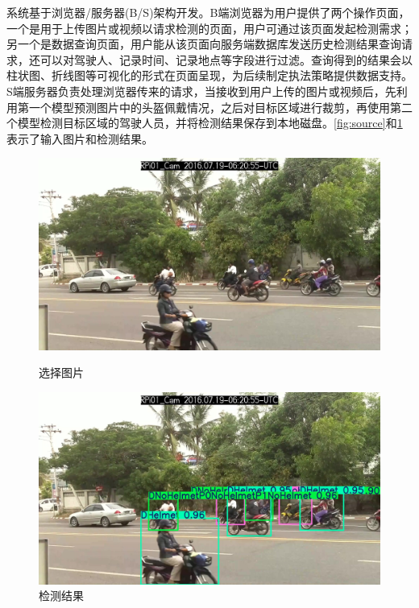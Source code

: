 系统基于浏览器/服务器(B/S)架构开发。B端浏览器为用户提供了两个操作页面，一个是用于上传图片或视频以请求检测的页面，用户可通过该页面发起检测需求；另一个是数据查询页面，用户能从该页面向服务端数据库发送历史检测结果查询请求，还可以对驾驶人、记录时间、记录地点等字段进行过滤。查询得到的结果会以柱状图、折线图等可视化的形式在页面呈现，为后续制定执法策略提供数据支持。S端服务器负责处理浏览器传来的请求，当接收到用户上传的图片或视频后，先利用第一个模型预测图片中的头盔佩戴情况，之后对目标区域进行裁剪，再使用第二个模型检测目标区域的驾驶人员，并将检测结果保存到本地磁盘。\ref{fig:source}和\ref{fig:result}表示了输入图片和检测结果。

\begin{figure}[!htb]
  \centering
  \begin{minipage}{0.45\textwidth} %
      \centering
      \includegraphics[width=\textwidth]{figs/chap01/source.jpg}
      \caption{选择图片}
      \label{fig:source}
  \end{minipage}
  \hfill %
  \begin{minipage}{0.45\textwidth}
      \centering
      \includegraphics[width=\textwidth]{figs/chap01/result.png}
      \caption{检测结果}
      \label{fig:result}
  \end{minipage}
\end{figure}


